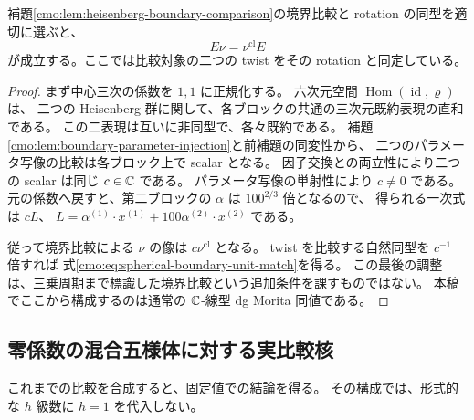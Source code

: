 \begin{proposition}
\label{cmo:prop:spherical-boundary-unit-match}
補題\ref{cmo:lem:heisenberg-boundary-comparison}の境界比較と
rotation の同型を適切に選ぶと、
\begin{equation}\label{cmo:eq:spherical-boundary-unit-match}
 E\nu=\nu^{\mathrm{cl}}E
\end{equation}
が成立する。ここでは比較対象の二つの twist をその rotation と同定している。
\end{proposition}

\begin{proof}
まず中心三次の係数を $1,1$ に正規化する。
六次元空間 $\operatorname{Hom}(\operatorname{id},\varrho)$ は、
二つの Heisenberg 群に関して、各ブロックの共通の三次元既約表現の直和である。
この二表現は互いに非同型で、各々既約である。
補題\ref{cmo:lem:boundary-parameter-injection}と前補題の同変性から、
二つのパラメータ写像の比較は各ブロック上で scalar となる。
因子交換との両立性により二つの scalar は同じ $c\in\mathbb C$ である。
パラメータ写像の単射性により $c\ne0$ である。
元の係数へ戻すと、第二ブロックの $\alpha$ は $100^{2/3}$ 倍となるので、
得られる一次式は $cL$、
$L=\alpha^{(1)}\cdot x^{(1)}+100\alpha^{(2)}\cdot x^{(2)}$ である。

従って境界比較による $\nu$ の像は $c\nu^{\mathrm{cl}}$ となる。
twist を比較する自然同型を $c^{-1}$ 倍すれば
式\eqref{cmo:eq:spherical-boundary-unit-match}を得る。
この最後の調整は、三乗周期まで標識した境界比較という追加条件を課すものではない。
本稿でここから構成するのは通常の $\mathbb C$-線型 dg Morita 同値である。
\end{proof}

\subsection{零係数の混合五様体に対する実比較核}
\label{cmo:subsec:fixed-zero-kernel}

これまでの比較を合成すると、固定値での結論を得る。
その構成では、形式的な $h$ 級数に $h=1$ を代入しない。

